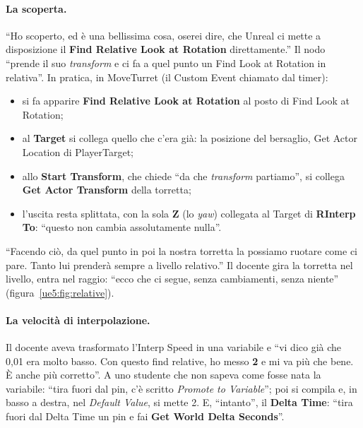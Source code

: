 \paragraph{La scoperta.} ``Ho scoperto, ed è una bellissima cosa, oserei dire, che Unreal
ci mette a disposizione il \textbf{Find Relative Look at Rotation} direttamente.'' Il
nodo ``prende il suo \emph{transform} e ci fa a quel punto un Find Look at Rotation in
relativa''. In pratica, in MoveTurret (il Custom Event chiamato dal timer):
\begin{itemize}
  \item si fa apparire \textbf{Find Relative Look at Rotation} al posto di Find Look at
        Rotation;
  \item al \textbf{Target} si collega quello che c'era già: la posizione del
        bersaglio, Get Actor Location di PlayerTarget;
  \item allo \textbf{Start Transform}, che chiede ``da che \emph{transform}
        partiamo'', si collega \textbf{Get Actor Transform} della torretta;
  \item l'uscita resta splittata, con la sola \textbf{Z} (lo \emph{yaw}) collegata al
        Target di \textbf{RInterp To}: ``questo non cambia assolutamente nulla''.
\end{itemize}
``Facendo ciò, da quel punto in poi la nostra torretta la possiamo ruotare come ci pare.
Tanto lui prenderà sempre a livello relativo.'' Il docente gira la torretta nel livello,
entra nel raggio: ``ecco che ci segue, senza cambiamenti, senza niente''
(figura~\ref{ue5:fig:relative}).

\paragraph{La velocità di interpolazione.} Il docente aveva trasformato l'Interp Speed in
una variabile e ``vi dico già che 0,01 era molto basso. Con questo find relative, ho
messo \textbf{2} e mi va più che bene. È anche più corretto''. A uno studente che non
sapeva come fosse nata la variabile: ``tira fuori dal pin, c'è scritto \emph{Promote to
Variable}''; poi si compila e, in basso a destra, nel \emph{Default Value}, si mette 2.
E, ``intanto'', il \textbf{Delta Time}: ``tira fuori dal Delta Time un pin e fai
\textbf{Get World Delta Seconds}''.

